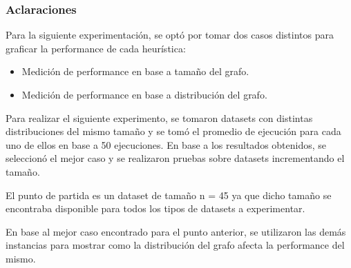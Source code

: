 \subsubsection{Aclaraciones}

Para la siguiente experimentación, se optó por tomar dos casos distintos para graficar la performance de cada heurística:

\begin{itemize}
\item Medición de performance en base a tamaño del grafo.
\item Medición de performance en base a distribución del grafo.
\end{itemize}

Para realizar el siguiente experimento, se tomaron datasets con distintas distribuciones del mismo tamaño y se tomó el promedio de ejecución para cada uno de ellos en base a 50 ejecuciones. En base a los resultados obtenidos, se seleccionó el mejor caso y se realizaron pruebas sobre datasets incrementando el tamaño.

\vskip 8pt

El punto de partida es un dataset de tamaño n = 45 ya que dicho tamaño se encontraba disponible para todos los tipos de datasets a experimentar.

En base al mejor caso encontrado para el punto anterior, se utilizaron las demás instancias para mostrar como la distribución del grafo afecta la performance del mismo.
